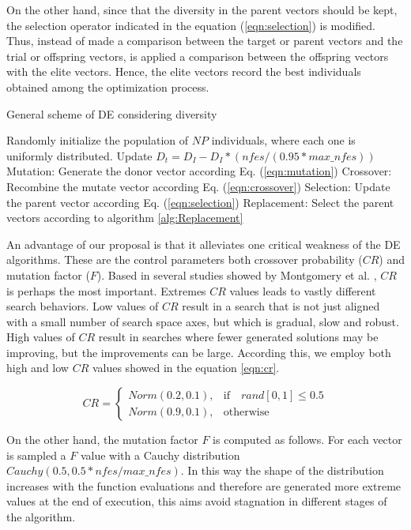 On the other hand, since that the diversity in the parent vectors should be kept, the selection operator indicated in the equation (\ref{eqn:selection}) is modified.
%
Thus, instead of made a comparison between the target or parent vectors and the trial or offspring vectors, is applied a comparison between the offspring vectors with the elite vectors.
%
Hence, the elite vectors record the best individuals obtained among the optimization process.
%


\begin{algorithm}[H]
  \scriptsize
	\caption{General scheme of DE considering diversity} 
	\begin{algorithmic}[1]
	\STATE Randomly initialize the population of $NP$ individuals, where each one is uniformly distributed.
	\STATE Update $D_t = D_I - D_I *(nfes/(0.95*max\_nfes)) $ 
		\STATE Mutation: Generate the donor vector according Eq. (\ref{eqn:mutation})
		\STATE Crossover: Recombine the mutate vector according Eq. (\ref{eqn:crossover})
		\STATE Selection: Update the parent vector according  Eq. (\ref{eqn:selection})
		\STATE Replacement: Select the parent vectors according to algorithm \ref{alg:Replacement}
	   \ENDFOR
	\ENDWHILE
    \label{alg:Fase_Remplazo_VSD-MOEAD}
\end{algorithmic}
\end{algorithm}


An advantage of our proposal is that it alleviates one critical weakness of the DE algorithms.
%
These are the control parameters both crossover probability ($CR$) and mutation factor ($F$).
%
Based in several studies showed by Montgomery et al. \cite{montgomery2010analysis}, $CR$ is perhaps the most important.
%
Extremes $CR$ values leads to vastly different search behaviors.
%
Low values of $CR$ result in a search that is not just aligned with a small number of search space axes, but which is gradual, slow and robust.
%
High values of $CR$ result in searches where fewer generated solutions may be improving, but the improvements can be large.
%
According this, we employ both high and low $CR$ values showed in the equation \ref{eqn:cr}.

\begin{equation} \label{eqn:cr}
CR = 
\begin{cases}
     Norm(0.2, 0.1),& \text{if} \quad rand[0,1] \leq 0.5  \\
     Norm(0.9, 0.1),              & \text{otherwise}
\end{cases}
\end{equation}


On the other hand, the mutation factor $F$ is computed as follows.
%
For each vector is sampled a $F$ value with a Cauchy distribution $Cauchy(0.5, 0.5*nfes/max\_nfes)$.
%
In this way the shape of the distribution increases with the function evaluations and therefore are generated more extreme values at the end of execution, this aims avoid stagnation in different stages of the algorithm.
%
